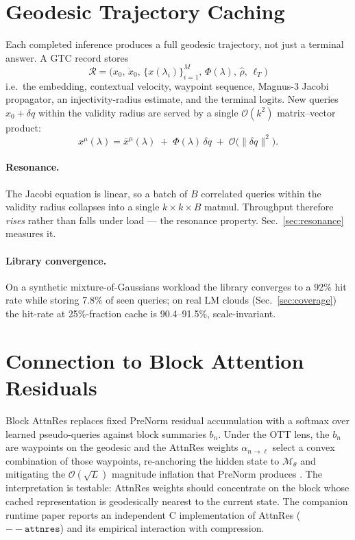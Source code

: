 \documentclass[11pt]{article}
\begin{document}
\section{Geodesic Trajectory Caching}
\label{sec:gtc}

Each completed inference produces a full geodesic trajectory, not just a
terminal answer. A GTC record stores
\begin{equation*}
\mathcal{R} = \bigl(x_0,\,\dot x_0,\,\{x(\lambda_i)\}_{i=1}^M,\,\Phi(\lambda),\,\hat\rho,\,\ell_T\bigr)
\end{equation*}
i.e.\ the embedding, contextual velocity, waypoint sequence, Magnus-3 Jacobi
propagator, an injectivity-radius estimate, and the terminal logits. New queries
$x_0+\delta q$ within the validity radius are served by a single
$\mathcal{O}(k^2)$ matrix--vector product:
\begin{equation}
x^\mu(\lambda) = \bar x^\mu(\lambda) \;+\; \Phi(\lambda)\,\delta q \;+\;
\mathcal{O}\bigl(\|\delta q\|^2\bigr).
\label{eq:gtc-correction}
\end{equation}

\paragraph{Resonance.} The Jacobi equation is linear, so a batch of $B$
correlated queries within the validity radius collapses into a single
$k\times k\times B$ matmul. Throughput therefore \emph{rises} rather than falls
under load --- the resonance property. Sec.~\ref{sec:resonance} measures it.

\paragraph{Library convergence.} On a synthetic mixture-of-Gaussians workload
the library converges to a 92\% hit rate while storing 7.8\% of seen queries;
on real LM clouds (Sec.~\ref{sec:coverage}) the hit-rate at 25\%-fraction cache
is 90.4--91.5\%, scale-invariant.

\section{Connection to Block Attention Residuals}

Block AttnRes \cite{kimi2026attnres} replaces fixed PreNorm residual
accumulation with a softmax over learned pseudo-queries against block
summaries $b_n$. Under the OTT lens, the $b_n$ are waypoints on the geodesic
and the AttnRes weights $\alpha_{n\to\ell}$ select a convex combination of
those waypoints, re-anchoring the hidden state to $\mathcal{M}_\theta$ and
mitigating the $\mathcal{O}(\sqrt L)$ magnitude inflation that PreNorm
produces \cite{xiao2023streamingllm}. The interpretation is testable: AttnRes
weights should concentrate on the block whose cached representation is
geodesically nearest to the current state. The companion runtime paper
\cite{papers3specdec} reports an independent C implementation of AttnRes
($\mathtt{-{}-attnres}$) and its empirical interaction with compression.
\end{document}
